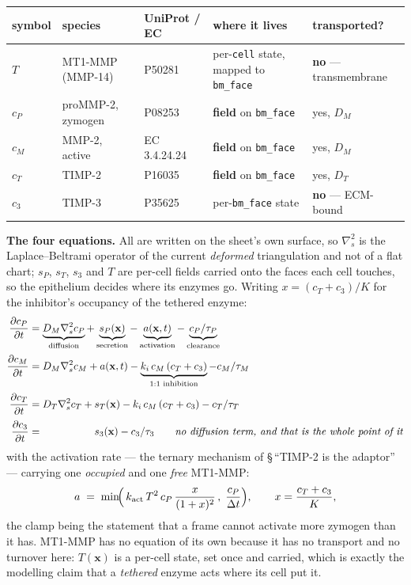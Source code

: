 \documentclass[10pt,a4paper]{article}
\newcommand{\code}[1]{\texttt{#1}}
\begin{document}
\smallskip
{\footnotesize
\begin{tabular}{@{}lllll@{}}\toprule
symbol & species & UniProt / EC & where it lives & transported?\\\midrule
$T$      & MT1-MMP (MMP-14)   & P50281 & per-\code{cell} state, mapped to \code{bm\_face} & \textbf{no} --- transmembrane\\
$c_P$    & proMMP-2, zymogen  & P08253 & \textbf{field} on \code{bm\_face} & yes, $D_M$\\
$c_M$    & MMP-2, active      & EC 3.4.24.24 & \textbf{field} on \code{bm\_face} & yes, $D_M$\\
$c_T$    & TIMP-2             & P16035 & \textbf{field} on \code{bm\_face} & yes, $D_T$\\
$c_3$    & TIMP-3             & P35625 & per-\code{bm\_face} state & \textbf{no} --- ECM-bound\\
\bottomrule\end{tabular}}
\smallskip

\textbf{The four equations.} All are written on the sheet's own surface, so $\nabla_s^2$ is the
Laplace--Beltrami operator of the current \emph{deformed} triangulation and not of a flat chart; $s_P$,
$s_T$, $s_3$ and $T$ are per-cell fields carried onto the faces each cell touches, so the epithelium
decides where its enzymes go. Writing $x=(c_T+c_3)/K$ for the inhibitor's occupancy of the tethered
enzyme:
%
\begin{align}
\frac{\partial c_P}{\partial t}
  &= \underbrace{D_M\nabla_s^2 c_P}_{\text{diffusion}}
   + \underbrace{s_P(\mathbf x)}_{\text{secretion}}
   - \underbrace{a(\mathbf x,t)}_{\text{activation}}
   - \underbrace{c_P/\tau_P}_{\text{clearance}} \label{eq:pro}\\[2pt]
\frac{\partial c_M}{\partial t}
  &= D_M\nabla_s^2 c_M
   + a(\mathbf x,t)
   - \underbrace{k_i\,c_M\,(c_T+c_3)}_{\text{1:1 inhibition}}
   - c_M/\tau_M \label{eq:mmp}\\[2pt]
\frac{\partial c_T}{\partial t}
  &= D_T\nabla_s^2 c_T + s_T(\mathbf x) - k_i\,c_M\,(c_T+c_3) - c_T/\tau_T \label{eq:timp}\\[2pt]
\frac{\partial c_3}{\partial t}
  &= \phantom{D_T\nabla_s^2 c_T +{}} s_3(\mathbf x) - c_3/\tau_3
   \qquad\text{\emph{no diffusion term, and that is the whole point of it}} \label{eq:timp3}
\end{align}
%
with the activation rate --- the ternary mechanism of \S\,``TIMP-2 is the adaptor'' --- carrying one
\emph{occupied} and one \emph{free} MT1-MMP:
%
\begin{equation}
a \;=\; \min\!\Bigl(\,k_{\rm act}\,T^2\,c_P\,\frac{x}{(1+x)^2}\,,\;\frac{c_P}{\Delta t}\Bigr),
\qquad x=\frac{c_T+c_3}{K},
\label{eq:act}
\end{equation}
%
the clamp being the statement that a frame cannot activate more zymogen than it has. MT1-MMP has no
equation of its own because it has no transport and no turnover here: $T(\mathbf x)$ is a per-cell
state, set once and carried, which is exactly the modelling claim that a \emph{tethered} enzyme acts
where its cell put it.
\end{document}
